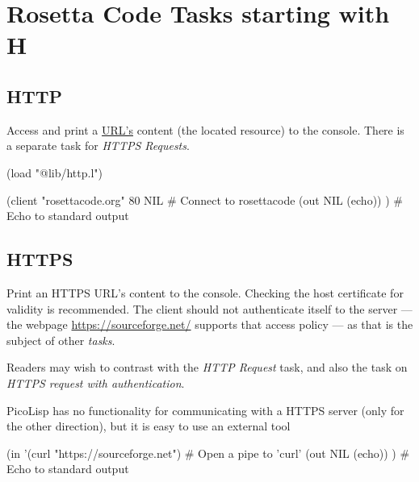 %
%
%

\chapter{Rosetta Code Tasks starting with H}

\section*{HTTP}

Access and print a
\href{http://en.wikipedia.org/wiki/Uniform\_Resource\_Locator}{URL's}
content (the located resource) to the console. There is a separate
task for \emph{HTTPS Requests}.


\begin{wideverbatim}

(load "@lib/http.l")

(client "rosettacode.org" 80 NIL       # Connect to rosettacode
   (out NIL (echo)) )                  # Echo to standard output

\end{wideverbatim}

\pagebreak{}
\section*{HTTPS}

Print an HTTPS URL's content to the console. Checking the host
certificate for validity is recommended. The client should not
authenticate itself to the server --- the webpage
\href{https://sourceforge.net/}{https://sourceforge.net/} supports that
access policy --- as that is the subject of other
\emph{tasks}.

Readers may wish to contrast with the \emph{HTTP Request} task, and
also the task on \emph{HTTPS request with authentication}.


\begin{wideverbatim}

PicoLisp has no functionality for communicating with a HTTPS server (only for
the other direction), but it is easy to use an external tool

(in '(curl "https://sourceforge.net")  # Open a pipe to 'curl'
   (out NIL (echo)) )                  # Echo to standard output

\end{wideverbatim}

